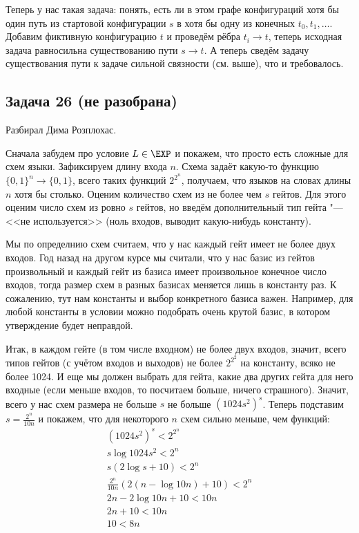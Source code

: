 		Теперь у нас такая задача: понять, есть ли в этом графе конфигураций хотя бы один
		путь из стартовой конфигурации $s$ в хотя бы одну из конечных $t_0, t_1, \dots$.
		Добавим фиктивную конфигурацию $t$ и проведём рёбра $t_i \to t$, теперь исходная
		задача равносильна существованию пути $s \to t$.
		А теперь сведём задачу существования пути к задаче сильной связности (см. выше),
		что и требовалось.

\subsection{Задача 26 (не разобрана)}
	Разбирал Дима Розплохас.

	Сначала забудем про условие $L \in \EXP$ и покажем, что просто есть сложные для схем языки.
	Зафиксируем длину входа $n$.
	Схема задаёт какую-то функцию $\{0, 1\}^n \to \{0, 1\}$, всего таких функций $2^{2^n}$,
	получаем, что языков на словах длины $n$ хотя бы столько.
	Оценим количество схем из не более чем $s$ гейтов.
	Для этого оценим число схем из ровно $s$ гейтов, но введём дополнительный тип гейта "--- <<не используется>>
	(ноль входов, выводит какую-нибудь константу).
	\begin{Rem}
		Мы по определнию схем считаем, что у нас каждый гейт имеет не более двух входов.
		Год назад на другом курсе мы считали, что у нас базис из гейтов произвольный и каждый гейт
		из базиса имеет произвольное конечное число входов, тогда размер схем в разных базисах
		меняется лишь в константу раз.
		К сожалению, тут нам константы и выбор конкретного базиса важен.
		Например, для любой константы в условии можно подобрать очень крутой базис, в котором
		утверждение будет неправдой.
	\end{Rem}
	Итак, в каждом гейте (в том числе входном) не более двух входов, значит, всего типов гейтов
	(с учётом входов и выходов) не более $2^{2^2}$ на константу, всяко не более 1024.
	И еще мы должен выбрать для гейта, какие два других гейта для него входные
	(если меньше входов, то посчитаем больше, ничего страшного).
	Значит, всего у нас схем размера не больше $s$ не больше $(1024s^2)^s$.
	Теперь подставим $s=\frac{2^n}{10n}$ и покажем, что для некоторого $n$ схем сильно меньше, чем функций:
	\begin{gather*}
		(1024s^2)^s < 2^{2^n} \\
		s \log 1024s^2 < 2^n \\
		s (2\log s + 10) < 2^n \\
		\frac{2^n}{10n} (2(n-\log 10n) + 10) < 2^n \\
		2n-2\log 10n + 10 < 10n \\
		2n + 10 < 10n \\
		10 < 8n
	\end{gather*}

